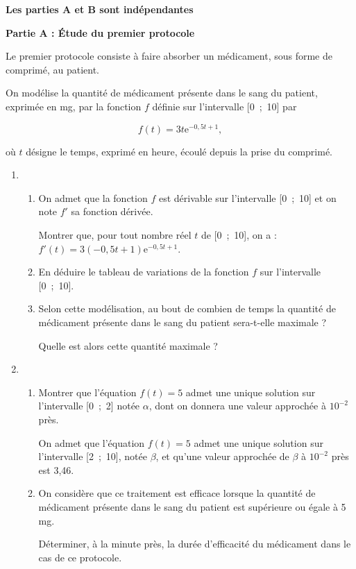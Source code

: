 \documentclass[10pt,a4paper]{article}
\begin{document}
\medskip

\textbf{Les parties A et B sont indépendantes}

\medskip

\textbf{Partie A : Étude du premier protocole}

\medskip

Le premier protocole consiste à faire absorber un médicament, sous forme de comprimé, au patient.

On modélise la quantité de médicament présente dans le sang du patient, exprimée en mg, par la fonction $f$ définie sur l'intervalle [0~;~10] par 

\[f(t) = 3t\text{e}^{-0,5t+1},\]

où $t$ désigne le temps, exprimé en heure, écoulé depuis la prise du comprimé.

\medskip

\begin{enumerate}
\item 
	\begin{enumerate}
		\item On admet que la fonction $f$ est dérivable sur l'intervalle [0~;~10] et on note $f'$ sa fonction dérivée.
		
Montrer que, pour tout nombre réel $t$ de [0~;~10], on a : $f'(t) = 3(- 0,5t + 1)\text{e}^{-0,5t+1}$.
		\item En déduire le tableau de variations de la fonction $f$ sur l'intervalle [0~;~10].
		\item Selon cette modélisation, au bout de combien de temps la quantité de médicament présente dans le sang du patient sera-t-elle maximale ?
		
Quelle est alors cette quantité maximale ?
	\end{enumerate}
\item 
	\begin{enumerate}
		\item Montrer que l'équation $f(t) = 5$ admet une unique solution sur l'intervalle [0~;~2] notée $\alpha$, dont on donnera une valeur approchée à $10^{-2}$ près.
		
On admet que l'équation $f(t) = 5$ admet une unique solution sur l'intervalle [2~;~10], notée $\beta$, et qu'une valeur approchée de $\beta$ à $10^{-2}$ près est 3,46.
		\item On considère que ce traitement est efficace lorsque la quantité de médicament présente dans le sang du patient est supérieure ou égale à 5 mg.
		
Déterminer, à la minute près, la durée d'efficacité du médicament dans le cas de ce protocole.
	\end{enumerate}
\end{enumerate}
\end{document}
